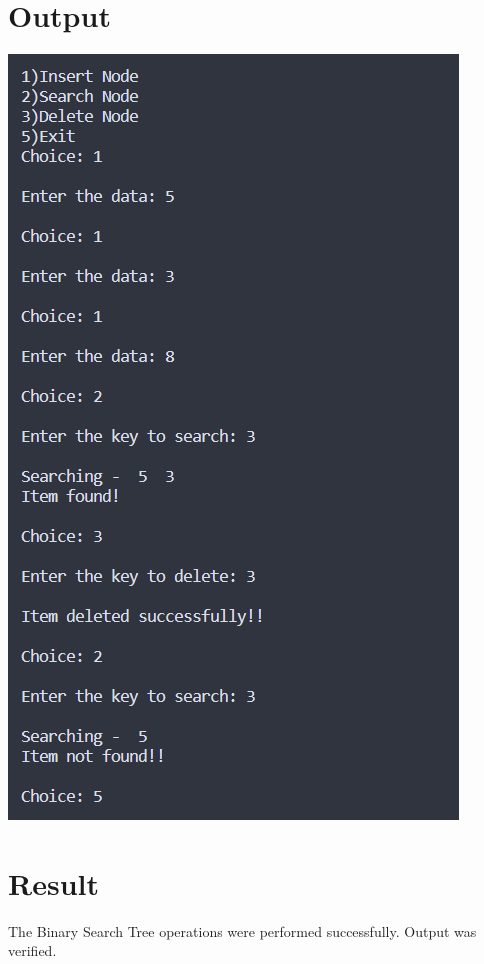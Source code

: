 \section{Output}
\includegraphics[]{Cycle_2/Outputs/BinarySearchTree.png}

\section{Result}
The Binary Search Tree operations were performed successfully. Output was verified.